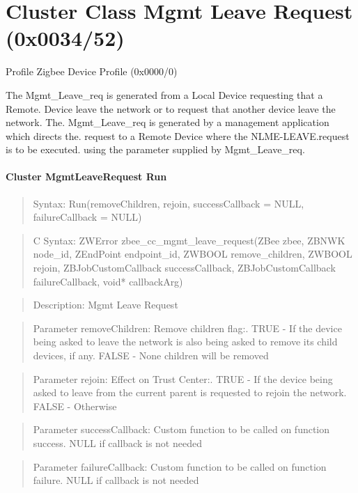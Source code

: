 \section{Cluster Class Mgmt Leave Request (0x0034/52)}

Profile Zigbee Device Profile (0x0000/0)

The Mgmt\_Leave\_req is generated from a Local Device requesting that a Remote. Device leave the network or to request that another device leave the network. The. Mgmt\_Leave\_req is generated by a management application which directs the. request to a Remote Device where the NLME-LEAVE.request is to be executed. using the parameter supplied by Mgmt\_Leave\_req.
\paragraph{Cluster MgmtLeaveRequest Run}
\begin{quote}Syntax: Run(removeChildren, rejoin, successCallback = NULL, failureCallback = NULL)\end{quote}
\begin{quote}C Syntax: ZWError zbee\_cc\_mgmt\_leave\_request(ZBee zbee, ZBNWK node\_id, ZEndPoint endpoint\_id, ZWBOOL remove\_children, ZWBOOL rejoin, ZBJobCustomCallback successCallback, ZBJobCustomCallback failureCallback, void* callbackArg)\end{quote}
\begin{quote}Description: Mgmt Leave Request\end{quote}
\begin{quote}Parameter removeChildren: Remove children flag:. TRUE  - If the device being asked to leave the network is also being asked to remove its child devices, if any. FALSE - None children will be removed\end{quote}
\begin{quote}Parameter rejoin: Effect on Trust Center:. TRUE  - If the device being asked to leave from the current parent is requested to rejoin the network. FALSE - Otherwise\end{quote}
\begin{quote}Parameter successCallback: Custom function to be called on function success. NULL if callback is not needed\end{quote}
\begin{quote}Parameter failureCallback: Custom function to be called on function failure. NULL if callback is not needed\end{quote}



